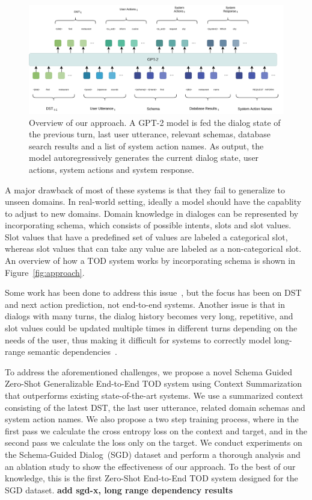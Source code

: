 \begin{figure}
    \centering
    \includegraphics[width=\linewidth]{assets/our_model.png}
    \caption{
        Overview of our approach. A GPT-2 model is fed the dialog state of the previous turn, last user utterance, relevant schemas, database search results and a list of system action names.
        As output, the model autoregressively generates the current dialog state, user actions, system actions and system response.
    }
    \label{fig:our_model}
\end{figure}

A major drawback of most of these systems is that they fail to generalize to unseen domains. In real-world setting, ideally a model
should have the capablity to adjust to new domains. Domain knowledge in dialoges can be represented by incorporating schema, which
consists of possible intents, slots and slot values. Slot values that have a predefined set of values are labeled a
categorical slot, whereas slot values that can take any value are labeled as a non-categorical slot.
An overview of how a TOD system works by incorporating schema is shown in Figure~\ref{fig:approach}.

Some work has been done to address this issue~\cite{Feng2020ASA,Lee2021DialogueST,Noroozi2020AFA,Mosig2020STARAS,Mehri2021SchemaGuidedPF},
but the focus has been on DST and next action prediction, not end-to-end systems.
Another issue is that in dialogs with many turns, the dialog history becomes very long, repetitive,
and slot values could be updated multiple times in different turns depending on the needs of the user,
thus making it difficult for systems to correctly model long-range semantic dependencies~\cite{sun2022mars}.

To address the aforementioned challenges, we propose a novel Schema Guided Zero-Shot Generalizable End-to-End TOD system using Context Summarization
that outperforms existing state-of-the-art systems.
We use a summarized context consisting of the latest DST, the last user utterance, related domain schemas and system action names.
We also propose a two step training process, where in the first pass we calculate the cross entropy loss on the context and target, and
in the second pass we calculate the loss only on the target. We conduct experiments on the Schema-Guided Dialog~(SGD) dataset
and perform a thorough analysis and an ablation study to show the effectiveness of our approach. To the best of our knowledge,
this is the first Zero-Shot End-to-End TOD system designed for the SGD dataset. \textbf{add sgd-x, long range dependency results}


